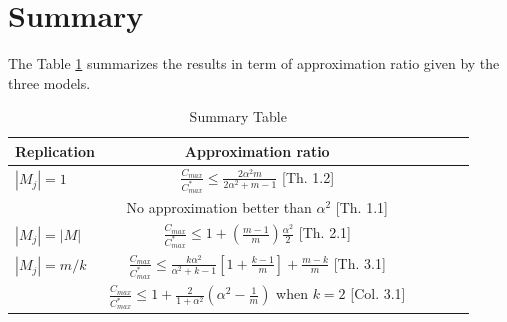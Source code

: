 \documentclass[10pt, conference, compsocconf]{IEEEtran}
\begin{document}
%





\section{Summary}

The Table \ref{tab:template} summarizes the results in term of approximation ratio given by the three models.

\begin{table}[ht]
\centering
\begin{tabular}{|l|c|c|c|c|c|}
\hline
Replication & Approximation ratio  \\
\hline
$|M_j|=1$ & $\frac{C_{max}}{C_{max}^{*}}\leq \frac{2\alpha^{2}m}{2\alpha^{2}+ m-1}$ [Th. 1.2]  \\
 & No approximation better than $\alpha^2$ [Th. 1.1]   \\

\hline
$|M_j|=|M|$ & $\frac{C_{max}}{C_{max}^{*}} \leq 1 + (\frac{m-1}{m})\frac{\alpha^{2}}{2}$ [Th. 2.1]  \\

 \hline
 
 $|M_j|= m/k $ & $\frac{C_{max}}{C_{max}^{*}} \leq \frac{k\alpha^{2}}{\alpha^{2}+k-1}\left[1+ {\frac{k-1}{m}} \right]+ {\frac{m-k}{m}}$ [Th. 3.1]  \\
  & $\frac{C_{max}}{C_{max}^{*}} \leq  1+ \frac{2}{1+\alpha^{2}} \left(\alpha^2-\frac{1}{m}\right)$ when $k=2$ [Col. 3.1]   \\
  
  \hline
 \end{tabular}
\caption{Summary Table}
\label{tab:template}
\end{table}
\end{document}

